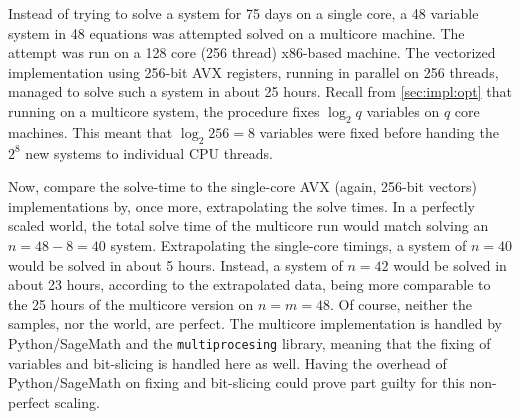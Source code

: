 Instead of trying to solve a system for 75 days on a single core, a 48 variable system in 48 equations was attempted solved on a multicore machine. The attempt was run on a 128 core (256 thread) x86-based machine. The vectorized implementation using 256-bit AVX registers, running in parallel on 256 threads, managed to solve such a system in about 25 hours. Recall from \cref{sec:impl:opt} that running on a multicore system, the procedure fixes $\log_2 q$ variables on $q$ core machines. This meant that $\log_2 256 = 8$ variables were fixed before handing the $2^8$ new systems to individual CPU threads. 

Now, compare the solve-time to the single-core AVX (again, 256-bit vectors) implementations by, once more, extrapolating the solve times. In a perfectly scaled world, the total solve time of the multicore run would match solving an $n = 48 - 8 = 40$ system. Extrapolating the single-core timings, a system of $n = 40$ would be solved in about 5 hours. Instead, a system of $n = 42$ would be solved in about 23 hours, according to the extrapolated data, being more comparable to the 25 hours of the multicore version on $n = m = 48$. Of course, neither the samples, nor the world, are perfect. The multicore implementation is handled by Python/SageMath and the \texttt{multiprocesing} library, meaning that the fixing of variables and bit-slicing is handled here as well. Having the overhead of Python/SageMath on fixing and bit-slicing could prove part guilty for this non-perfect scaling. 



\newpage